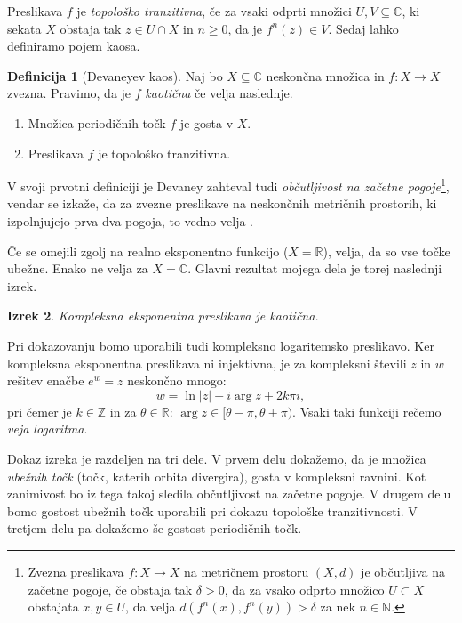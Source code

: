 \documentclass[a4paper, oneside]{amsart}
\newcommand{\NN}{\mathbb{N}}
\newcommand{\ZZ}{\mathbb{Z}}
\newcommand{\RR}{\mathbb{R}}
\newcommand{\CC}{\mathbb{C}}
\theoremstyle{plain}
\newtheorem{theorem}{Izrek}[section]
\theoremstyle{definition}
\newtheorem{definition}[theorem]{Definicija}
\begin{document}
Preslikava \(f\) je \emph{topološko tranzitivna}, če za vsaki odprti
množici \(U, V \subseteq \CC\), ki sekata \(X\) obstaja tak \(z \in U \cap X\)
in \(n \geq 0\), da je \(f^n (z) \in V\). Sedaj lahko definiramo pojem kaosa.

\begin{definition}[Devaneyev kaos]
    Naj bo \(X \subseteq \CC\) neskončna množica in \(f \colon X \to X\) zvezna.
    Pravimo, da je \(f\) \emph{kaotična} če velja naslednje.
    \begin{enumerate}
        \item Množica periodičnih točk \(f\) je gosta v \(X\).
        \item Preslikava \(f\) je topološko tranzitivna.
    \end{enumerate}
\end{definition}

V svoji prvotni definiciji je Devaney zahteval tudi \emph{občutljivost na začetne
pogoje}\footnote{Zvezna preslikava \(f \colon X \to X\) na metričnem prostoru
\((X, d)\) je občutljiva na začetne pogoje, če obstaja tak \(\delta > 0\), da za
vsako odprto množico \(U \subset X\) obstajata \(x, y \in U\), da velja
\(d (f^n(x), f^n (y)) > \delta\) za nek \(n \in \NN\).}, vendar se izkaže, da
za zvezne preslikave na neskončnih metričnih prostorih, ki izpolnjujejo prva dva
pogoja, to vedno velja \cite{implikacija1992}.

Če se omejili zgolj na realno eksponentno funkcijo (\(X = \RR\)), velja, da so vse
točke ubežne. Enako ne velja za \(X = \CC\). Glavni rezultat mojega dela je 
torej naslednji izrek.

\begin{theorem}
    Kompleksna eksponentna preslikava je kaotična.
\end{theorem}

Pri dokazovanju bomo uporabili tudi kompleksno logaritemsko preslikavo. Ker
kompleksna eksponentna preslikava ni injektivna, je za kompleksni števili
\(z\) in \(w\) rešitev enačbe \(e^w = z\) neskončno mnogo:
\[w = \ln |z| + i \operatorname{arg} z + 2 k \pi i,\]
pri čemer je \(k \in \ZZ\) in za \(\theta \in \RR\):
\(\operatorname{arg} z \in [\theta - \pi, \theta + \pi)\). Vsaki taki funkciji
rečemo \emph{veja logaritma}.

Dokaz izreka je razdeljen na tri dele. V prvem delu dokažemo, da je množica
\emph{ubežnih točk} (točk, katerih orbita divergira), gosta v kompleksni ravnini.
Kot zanimivost bo iz tega takoj sledila občutljivost na začetne pogoje. V drugem
delu bomo gostost ubežnih točk uporabili pri dokazu topološke tranzitivnosti.
V tretjem delu pa dokažemo še gostost periodičnih točk.
\end{document}
